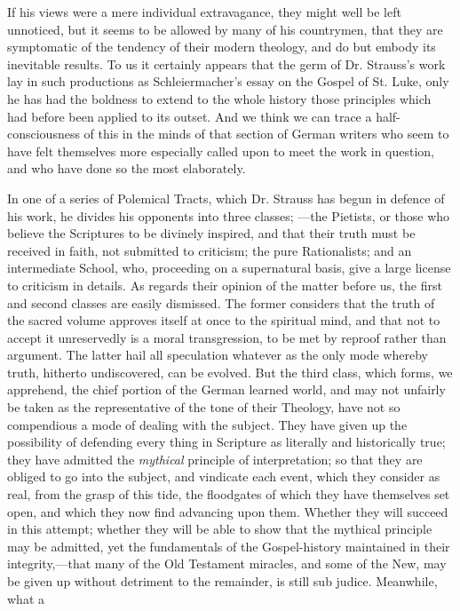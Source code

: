 If his views were a mere individual extravagance,
they might well be left unnoticed, but it seems to be allowed by many of
his countrymen, that they are symptomatic of the tendency of their
modern theology, and do but embody its inevitable results. To us it
certainly appears that the germ of Dr. Strauss's work lay in such
productions as Schleiermacher's essay on the Gospel of St. Luke, only he
has had the boldness to extend to the whole history those principles
which had before been applied to its outset. And we think we can trace a
half-consciousness of this in the minds of that section of German
writers who seem to have felt themselves more especially called upon to
meet the work in question, and who have done so the most elaborately.

In one of a series of Polemical Tracts, which Dr.
Strauss has begun in defence of his work, he divides his opponents into
three classes; —the Pietists, or those who believe the Scriptures to
be divinely inspired, and that their truth must be received in faith,
not submitted to criticism; the pure Rationalists; and an intermediate
School, who, proceeding on a supernatural basis, give a large license to
criticism in details. As regards their opinion of the matter before us,
the first and second classes are easily dismissed. The former considers
that the truth of the sacred volume approves itself at once to the
spiritual mind, and that not to accept it unreservedly is a moral
transgression, to be met by reproof rather than argument. The latter
hail all speculation whatever as the only mode whereby truth, hitherto
undiscovered, can be evolved. But the third class, which forms, we
apprehend, the chief portion of the German learned world, and may not
unfairly be taken as the representative of the tone of their Theology,
have not so compendious a mode of dealing with the subject. They have
given up the possibility of defending every thing in Scripture as
literally and historically true; they have admitted the \emph{mythical}
principle of interpretation; so that they are obliged to go into the
subject, and vindicate each event, which they consider as real, from the
grasp of this tide, the floodgates of which they have themselves set
open, and which they now find advancing upon them. Whether they will
succeed in this attempt; whether they will be able to show that the
mythical principle may be admitted, yet the fundamentals of the
Gospel-history maintained in their integrity,—that many of the Old
Testament miracles, and some of the New, may be given up without
detriment to the remainder, is still sub judice. Meanwhile, what a
